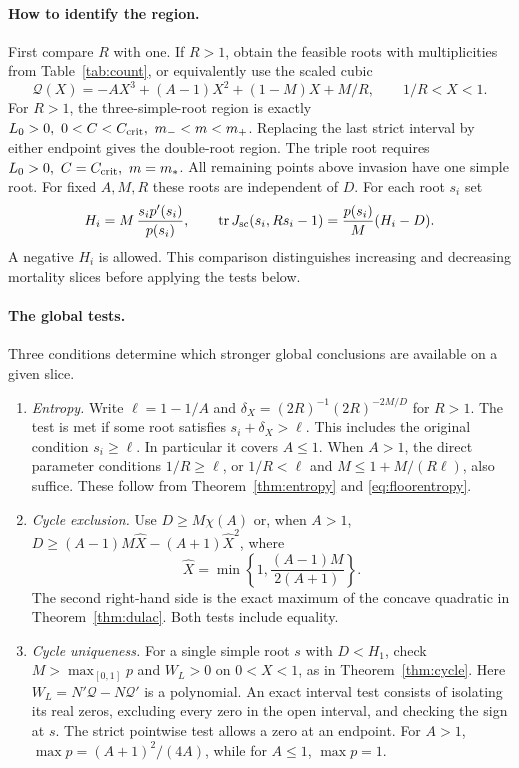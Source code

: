 \documentclass[12pt,a4paper,twoside,fleqn]{article}
\theoremstyle{journal}
\newcommand{\tr}{\operatorname{tr}}
\newcommand{\Q}{\mathcal Q}
\begin{document}
\paragraph{How to identify the region.}
First compare \(R\) with one. If \(R>1\), obtain the feasible roots with multiplicities from Table~\ref{tab:count}, or equivalently use the scaled cubic
\[
 \Q(X)=-AX^3+(A-1)X^2+(1-M)X+M/R,\qquad 1/R<X<1 .
\]
For \(R>1\), the three-simple-root region is exactly \(L_0>0,\ 0<C<C_{\rm crit},\ m_-<m<m_+\). Replacing the last strict interval by either endpoint gives the double-root region. The triple root requires \(L_0>0,\ C=C_{\rm crit},\ m=m_*\). All remaining points above invasion have one simple root. For fixed \(A,M,R\) these roots are independent of \(D\). For each root \(s_i\) set
\begin{equation}\label{eq:atlastrace}
 H_i=M\,\frac{s_i p'(s_i)}{p(s_i)},\qquad
 \tr J_{\rm sc}(s_i,Rs_i-1)=\frac{p(s_i)}{M}(H_i-D).
\end{equation}
A negative \(H_i\) is allowed. This comparison distinguishes increasing and decreasing mortality slices before applying the tests below.

\paragraph{The global tests.}
Three conditions determine which stronger global conclusions are available on a given slice.
\begin{enumerate}
\item \emph{Entropy.} Write \(\ell=1-1/A\) and \(\delta_X=(2R)^{-1}(2R)^{-2M/D}\) for \(R>1\). The test is met if some root satisfies \(s_i+\delta_X>\ell\). This includes the original condition \(s_i\ge\ell\). In particular it covers \(A\le1\). When \(A>1\), the direct parameter conditions \(1/R\ge\ell\), or \(1/R<\ell\) and \(M\le1+M/(R\ell)\), also suffice. These follow from Theorem~\ref{thm:entropy} and \eqref{eq:floorentropy}.
\item \emph{Cycle exclusion.} Use \(D\ge M\chi(A)\) or, when \(A>1\), \(D\ge (A-1)M\widehat X-(A+1)\widehat X^2\), where
\[
 \widehat X=\min\left\{1,\frac{(A-1)M}{2(A+1)}\right\}.
\]
The second right-hand side is the exact maximum of the concave quadratic in Theorem~\ref{thm:dulac}. Both tests include equality.
\item \emph{Cycle uniqueness.} For a single simple root \(s\) with \(D<H_1\), check \(M>\max_{[0,1]}p\) and \(W_L>0\) on \(0<X<1\), as in Theorem~\ref{thm:cycle}. Here \(W_L=N'\Q-N\Q'\) is a polynomial. An exact interval test consists of isolating its real zeros, excluding every zero in the open interval, and checking the sign at \(s\). The strict pointwise test allows a zero at an endpoint. For \(A>1\), \(\max p=(A+1)^2/(4A)\), while for \(A\le1\), \(\max p=1\).
\end{enumerate}
\end{document}
